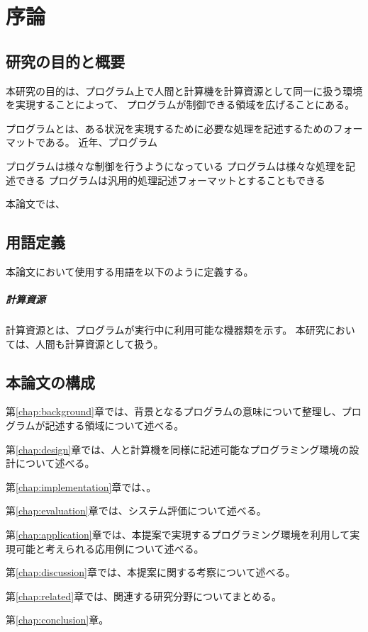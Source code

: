 \chapter{序論}\label{chap:introduction}

\section{研究の目的と概要}\label{ux7814ux7a76ux306eux76eeux7684ux3068ux6982ux8981}

本研究の目的は、プログラム上で人間と計算機を計算資源として同一に扱う環境を実現することによって、
プログラムが制御できる領域を広げることにある。

プログラムとは、ある状況を実現するために必要な処理を記述するためのフォーマットである。
近年、プログラム

プログラムは様々な制御を行うようになっている
プログラムは様々な処理を記述できる
プログラムは汎用的処理記述フォーマットとすることもできる

本論文では、

\section{用語定義}\label{ux7528ux8a9eux5b9aux7fa9}

本論文において使用する用語を以下のように定義する。

\paragraph{計算資源}\label{ux8a08ux7b97ux8cc7ux6e90}

計算資源とは、プログラムが実行中に利用可能な機器類を示す。
本研究においては、人間も計算資源として扱う。

\section{本論文の構成}\label{ux672cux8ad6ux6587ux306eux69cbux6210}

第\ref{chap:background}章では、背景となるプログラムの意味について整理し、プログラムが記述する領域について述べる。

第\ref{chap:design}章では、人と計算機を同様に記述可能なプログラミング環境の設計について述べる。

第\ref{chap:implementation}章では、。

第\ref{chap:evaluation}章では、システム評価について述べる。

第\ref{chap:application}章では、本提案で実現するプログラミング環境を利用して実現可能と考えられる応用例について述べる。

第\ref{chap:discussion}章では、本提案に関する考察について述べる。

第\ref{chap:related}章では、関連する研究分野についてまとめる。

第\ref{chap:conclusion}章。
